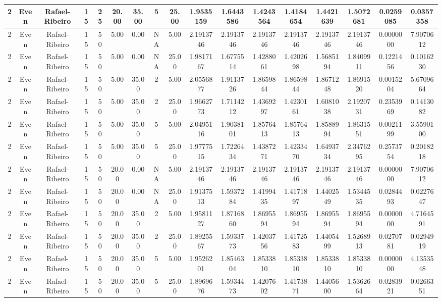 \begin{longtable}{ | c | c | c | c | c | c | c | c | c | c | c | c | c | c | c | c | c | }
	\hline
	2	&	Even	&	Rafael-Ribeiro	&	15	&	25	&	20.00	&	35.00	&	5	&	25.00	&	1.9535159	&	1.6443586	&	1.4243564	&	1.4184654	&	1.4421639	&	1.5072681	&	0.0259085	&	0.0357358 \\
	\hline
	2	&	Even	&	Rafael-Ribeiro	&	15	&	50	&	5.00	&	0.00	&	NA	&	5.00	&	2.1913746	&	2.1913746	&	2.1913746	&	2.1913746	&	2.1913746	&	2.1913746	&	0.0000000	&	7.9070612 \\
	\hline
	2	&	Even	&	Rafael-Ribeiro	&	15	&	50	&	5.00	&	0.00	&	NA	&	25.00	&	1.9817167	&	1.6775514	&	1.4288061	&	1.4202698	&	1.5685194	&	1.8409911	&	0.1221456	&	0.1016230 \\
	\hline
	2	&	Even	&	Rafael-Ribeiro	&	15	&	50	&	5.00	&	35.00	&	2	&	5.00	&	2.0556877	&	1.9113726	&	1.8659844	&	1.8659844	&	1.8671248	&	1.8691520	&	0.0015204	&	5.6709664 \\
	\hline
	2	&	Even	&	Rafael-Ribeiro	&	15	&	50	&	5.00	&	35.00	&	2	&	25.00	&	1.9662773	&	1.7114212	&	1.4369297	&	1.4230161	&	1.6081038	&	2.1920731	&	0.2353969	&	0.1413082 \\
	\hline
	2	&	Even	&	Rafael-Ribeiro	&	15	&	50	&	5.00	&	35.00	&	5	&	5.00	&	2.0495116	&	1.9038101	&	1.8576413	&	1.8576413	&	1.8588994	&	1.8631551	&	0.0021199	&	3.5590100 \\
	\hline
	2	&	Even	&	Rafael-Ribeiro	&	15	&	50	&	5.00	&	35.00	&	5	&	25.00	&	1.9777515	&	1.7226434	&	1.4387271	&	1.4233470	&	1.6493734	&	2.3476295	&	0.2573754	&	0.2018218 \\
	\hline
	2	&	Even	&	Rafael-Ribeiro	&	15	&	50	&	20.00	&	0.00	&	NA	&	5.00	&	2.1913746	&	2.1913746	&	2.1913746	&	2.1913746	&	2.1913746	&	2.1913746	&	0.0000000	&	7.9070612 \\
	\hline
	2	&	Even	&	Rafael-Ribeiro	&	15	&	50	&	20.00	&	0.00	&	NA	&	25.00	&	1.9137513	&	1.5937284	&	1.4199435	&	1.4171897	&	1.4402549	&	1.5344535	&	0.0284493	&	0.0227647 \\
	\hline
	2	&	Even	&	Rafael-Ribeiro	&	15	&	50	&	20.00	&	35.00	&	2	&	5.00	&	1.9581127	&	1.8716860	&	1.8695594	&	1.8695594	&	1.8695594	&	1.8695594	&	0.0000000	&	4.7164591 \\
	\hline
	2	&	Even	&	Rafael-Ribeiro	&	15	&	50	&	20.00	&	35.00	&	2	&	25.00	&	1.8925567	&	1.5933773	&	1.4203756	&	1.4172583	&	1.4405499	&	1.5268913	&	0.0270781	&	0.0294919 \\
	\hline
	2	&	Even	&	Rafael-Ribeiro	&	15	&	50	&	20.00	&	35.00	&	5	&	5.00	&	1.9526201	&	1.8546304	&	1.8533810	&	1.8533810	&	1.8533810	&	1.8533810	&	0.0000000	&	4.1353548 \\
	\hline
	2	&	Even	&	Rafael-Ribeiro	&	15	&	50	&	20.00	&	35.00	&	5	&	25.00	&	1.8969676	&	1.5934473	&	1.4207602	&	1.4173871	&	1.4405600	&	1.5362664	&	0.0283921	&	0.0266351 \\

\end{longtable}
